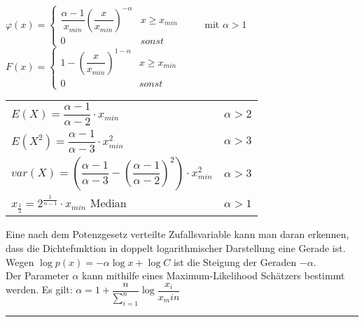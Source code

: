 \begin{multicols}{2}
	$\varphi(x) = \begin{cases}
	\dfrac{\alpha - 1}{x_{min}} \left( \dfrac{x}{x_{min}}\right)^{-\alpha} & x \geq x_{min} \\
	0 & sonst
	\end{cases} \qquad $ mit $\alpha > 1$\\
	
	$ F(x) = \begin{cases}
	1-\left( \dfrac{x}{x_{min}} \right)^{1-\alpha} & x \geq x_{min}\\
	0 & sonst
	\end{cases}$
	
	\columnbreak
	\begin{tabular}{ll}
		$E(X) = \dfrac{\alpha - 1}{\alpha - 2} \cdot x_{min}$ & $\alpha > 2$\\
		$E(X^2) = \dfrac{\alpha - 1}{\alpha - 3} \cdot x_{min}^2$ & $\alpha > 3$ \\
		$var(X) = \left(\dfrac{\alpha - 1}{\alpha - 3} - \left(\dfrac{\alpha -1}{\alpha -2}\right)^2\right)\cdot x_{min}^2$  & $\alpha > 3$\\
		$x_{\frac{1}{2}} = 2^{\frac{1}{\alpha - 1}} \cdot x_{min}$ \quad Median & $\alpha > 1$\\
	\end{tabular}

\end{multicols}
	
Eine nach dem Potenzgesetz verteilte Zufallsvariable kann man daran erkennen, dass die Dichtefunktion in doppelt logarithmischer Darstellung eine Gerade ist. Wegen
$\log p(x) = -\alpha \log x + \log C$ ist die Steigung der Geraden $-\alpha$. \\

Der Parameter $\alpha$ kann mithilfe eines Maximum-Likelihood Schätzers bestimmt werden. Es gilt: $\alpha = 1 + \dfrac{n}{\sum_{i=1}^{n}} \log \dfrac{x_i}{x_min}$ \\
\hrule
